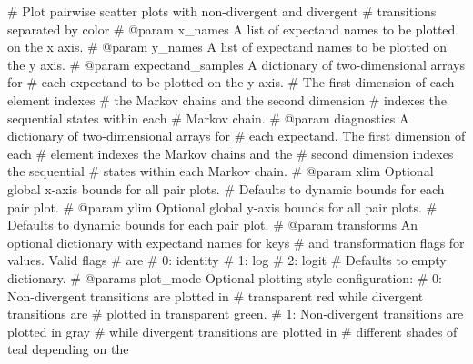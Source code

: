 \documentclass[
  letterpaper,
  DIV=11,
  numbers=noendperiod]{scrartcl}
\newenvironment{Shaded}{\begin{snugshade}}{\end{snugshade}}
\newcommand{\CommentTok}[1]{\textcolor[rgb]{0.37,0.37,0.37}{#1}}
\begin{document}
\begin{Shaded}
\begin{Highlighting}[]

\CommentTok{\# Plot pairwise scatter plots with non{-}divergent and divergent }
\CommentTok{\# transitions separated by color}
\CommentTok{\# @param x\_names A list of expectand names to be plotted on the x axis.}
\CommentTok{\# @param y\_names A list of expectand names to be plotted on the y axis.}
\CommentTok{\# @param expectand\_samples A dictionary of two{-}dimensional arrays for}
\CommentTok{\#                          each expectand to be plotted on the y axis.}
\CommentTok{\#                          The first dimension of each element indexes }
\CommentTok{\#                          the Markov chains and the second dimension }
\CommentTok{\#                          indexes the sequential states within each }
\CommentTok{\#                          Markov chain.}
\CommentTok{\# @param diagnostics A dictionary of two{-}dimensional arrays for}
\CommentTok{\#                    each expectand.  The first dimension of each}
\CommentTok{\#                    element indexes the Markov chains and the }
\CommentTok{\#                    second dimension indexes the sequential }
\CommentTok{\#                    states within each Markov chain.}
\CommentTok{\# @param xlim       Optional global x{-}axis bounds for all pair plots.}
\CommentTok{\#                   Defaults to dynamic bounds for each pair plot.}
\CommentTok{\# @param ylim       Optional global y{-}axis bounds for all pair plots.}
\CommentTok{\#                   Defaults to dynamic bounds for each pair plot.}
\CommentTok{\# @param transforms An optional dictionary with expectand names for keys }
\CommentTok{\#                   and transformation flags for values.  Valid flags }
\CommentTok{\#                   are}
\CommentTok{\#                     0: identity}
\CommentTok{\#                     1: log}
\CommentTok{\#                     2: logit}
\CommentTok{\#                   Defaults to empty dictionary.}
\CommentTok{\# @params plot\_mode Optional plotting style configuration: }
\CommentTok{\#                     0: Non{-}divergent transitions are plotted in }
\CommentTok{\#                        transparent red while divergent transitions are}
\CommentTok{\#                        plotted in transparent green.}
\CommentTok{\#                     1: Non{-}divergent transitions are plotted in gray }
\CommentTok{\#                        while divergent transitions are plotted in }
\CommentTok{\#                        different shades of teal depending on the }

\end{Highlighting}
\end{Shaded}
\end{document}
